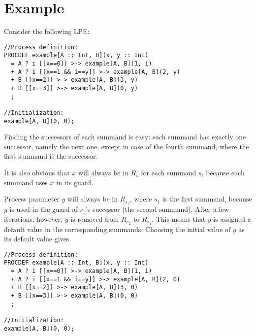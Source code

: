 \section{Example}

Consider the following LPE:

\begin{lstlisting}
//Process definition:
PROCDEF example[A :: Int, B](x, y :: Int)
  = A ? i [[x==0]] >-> example[A, B](1, i)
  + A ? i [[x==1 && i==y]] >-> example[A, B](2, y)
  + B [[x==2]] >-> example[A, B](3, y)
  + B [[x==3]] >-> example[A, B](0, y)
  ;

//Initialization:
example[A, B](0, 0);
\end{lstlisting}

Finding the successors of each summand is easy: each summand has exactly one successor, namely the next one, except in case of the fourth summand, where the first summand is the successor.

It is also obvious that $x$ will always be in $R_s$ for each summand $s$, because each summand uses $x$ in its guard.

Process parameter $y$ will always be in $R_{s_1}$, where $s_1$ is the first summand, because $y$ is used in the guard of $s_1$'s successor (the second summand).
After a few iterations, however, $y$ is removed from $R_{s_2}$ to $R_{s_4}$.
This means that $y$ is assigned a default value in the corresponding summands.
Choosing the initial value of $y$ as its default value gives

\begin{lstlisting}
//Process definition:
PROCDEF example[A :: Int, B](x, y :: Int)
  = A ? i [[x==0]] >-> example[A, B](1, i)
  + A ? i [[x==1 && i==y]] >-> example[A, B](2, 0)
  + B [[x==2]] >-> example[A, B](3, 0)
  + B [[x==3]] >-> example[A, B](0, 0)
  ;

//Initialization:
example[A, B](0, 0);
\end{lstlisting}




